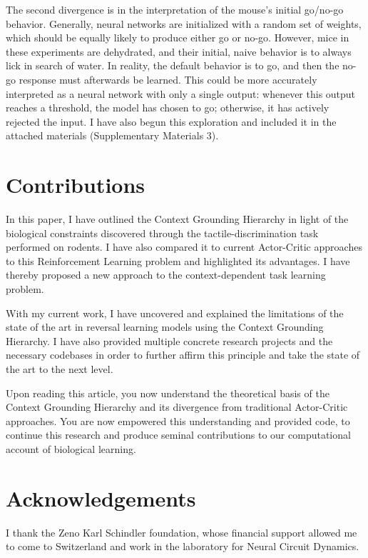 \documentclass[11pt]{article}
\begin{document}
The second divergence is in the interpretation of the mouse's initial go/no-go behavior.  Generally, neural networks are initialized with a random set of weights, which should be equally likely to produce either go or no-go.  However, mice in these experiments are dehydrated, and their initial, naive behavior is to always lick in search of water.  In reality, the default behavior is to go, and then the no-go response must afterwards be learned.  This could be more accurately interpreted as a neural network with only a single output: whenever this output reaches a threshold, the model has chosen to go; otherwise, it has actively rejected the input.  I have also begun this exploration and included it in the attached materials (Supplementary Materials 3).

\section{Contributions}
In this paper, I have outlined the Context Grounding Hierarchy in light of the biological constraints discovered through the tactile-discrimination task performed on rodents.  I have also compared it to current Actor-Critic approaches to this Reinforcement Learning problem and highlighted its advantages.  I have thereby proposed a new approach to the context-dependent task learning problem.

With my current work, I have uncovered and explained the limitations of the state of the art in reversal learning models using the Context Grounding Hierarchy.  I have also provided multiple concrete research projects and the necessary codebases in order to further affirm this principle and take the state of the art to the next level.

\newpage

Upon reading this article, you now understand the theoretical basis of the Context Grounding Hierarchy and its divergence from traditional Actor-Critic approaches. You are now empowered this understanding and provided code, to continue this research and produce seminal contributions to our computational account of biological learning.

\section{Acknowledgements}

I thank the Zeno Karl Schindler foundation, whose financial support allowed me to come to Switzerland and work in the laboratory for Neural Circuit Dynamics.
\end{document}

